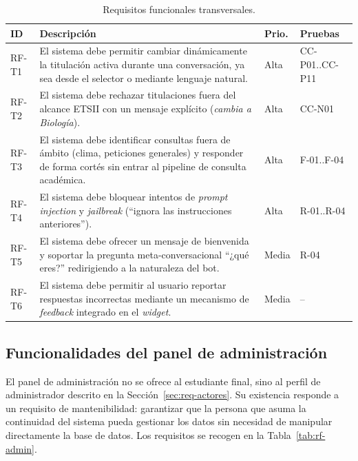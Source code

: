\begin{table}[hbtp]
\centering
\small
\caption{Requisitos funcionales transversales.}\label{tab:rf-transversal}
\begin{tabular}{|p{1.1cm}|p{8.2cm}|p{1.0cm}|p{2.0cm}|}
\hline
\textbf{ID} & \textbf{Descripción} & \textbf{Prio.} & \textbf{Pruebas} \\ \hline
RF-T1 & El sistema debe permitir cambiar dinámicamente la titulación activa durante una conversación, ya sea desde el selector o mediante lenguaje natural. & Alta & CC-P01..CC-P11 \\ \hline
RF-T2 & El sistema debe rechazar titulaciones fuera del alcance ETSII con un mensaje explícito (\textit{cambia a Biología}). & Alta & CC-N01 \\ \hline
RF-T3 & El sistema debe identificar consultas fuera de ámbito (clima, peticiones generales) y responder de forma cortés sin entrar al pipeline de consulta académica. & Alta & F-01..F-04 \\ \hline
RF-T4 & El sistema debe bloquear intentos de \textit{prompt injection} y \textit{jailbreak} (``ignora las instrucciones anteriores''). & Alta & R-01..R-04 \\ \hline
RF-T5 & El sistema debe ofrecer un mensaje de bienvenida y soportar la pregunta meta-conversacional ``¿qué eres?'' redirigiendo a la naturaleza del bot. & Media & R-04 \\ \hline
RF-T6 & El sistema debe permitir al usuario reportar respuestas incorrectas mediante un mecanismo de \textit{feedback} integrado en el \textit{widget}. & Media & -- \\ \hline
\end{tabular}
\end{table}

\subsection{Funcionalidades del panel de administración}\label{subsec:rf-admin}

El panel de administración no se ofrece al estudiante final, sino al perfil de administrador descrito en la Sección~\ref{sec:req-actores}. Su existencia responde a un requisito de mantenibilidad: garantizar que la persona que asuma la continuidad del sistema pueda gestionar los datos sin necesidad de manipular directamente la base de datos. Los requisitos se recogen en la Tabla~\ref{tab:rf-admin}.

